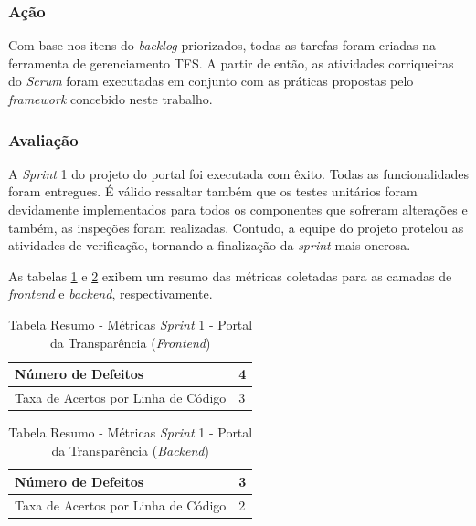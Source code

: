 \subsubsection{Ação}

Com base nos itens do \textit{backlog} priorizados, todas as tarefas foram criadas na ferramenta de gerenciamento TFS. A partir de então, as atividades corriqueiras do \textit{Scrum} foram executadas em conjunto com as práticas propostas pelo \textit{framework} concebido neste trabalho.

\subsubsection{Avaliação}

A \textit{Sprint} 1 do projeto do portal foi executada com êxito. Todas as funcionalidades foram entregues. É válido ressaltar também que os testes unitários foram devidamente implementados para todos os componentes que sofreram alterações e também, as inspeções foram realizadas. Contudo, a equipe do projeto protelou as atividades de verificação, tornando a finalização da \textit{sprint} mais onerosa.

As tabelas \ref{table:tabela2} e \ref{table:tabela3} exibem um resumo das métricas coletadas para as camadas de \textit{frontend} e \textit{backend}, respectivamente.

\begin{table}[h]
\caption{Tabela Resumo - Métricas \textit{Sprint} 1 - Portal da Transparência (\textit{Frontend})}
\centering
\begin{tabular}{ | m{8cm} | m{8cm} | } 
\hline
Número de Defeitos & 4 \\ 
\hline
Taxa de Acertos por Linha de Código & 3 \\ 
\hline
\end{tabular}
\label{table:tabela2}
\end{table}

\begin{table}[h]
\caption{Tabela Resumo - Métricas \textit{Sprint} 1 - Portal da Transparência (\textit{Backend})}
\centering
\begin{tabular}{ | m{8cm} | m{8cm} | } 
\hline
Número de Defeitos & 3 \\ 
\hline
Taxa de Acertos por Linha de Código & 2 \\ 
\hline
\end{tabular}
\label{table:tabela3}
\end{table}

